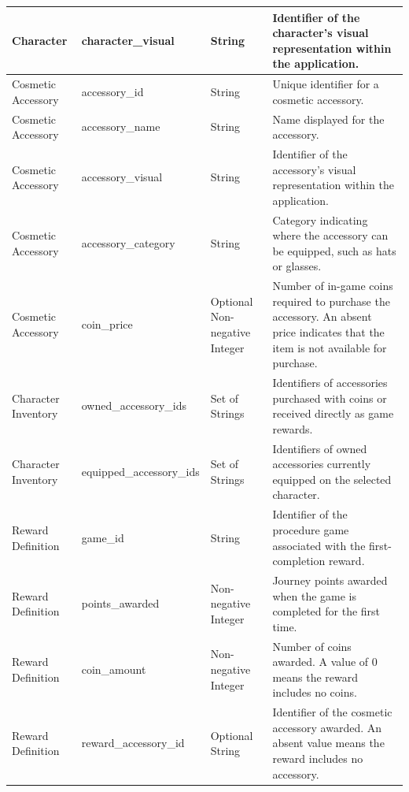 \documentclass[10pt]{article}
\begin{document}
\begin{longtable}{
    p{}
    p{}
    p{}
    p{}
}
Character &
character\_visual &
String &
Identifier of the character's visual representation
within the application. \\
\midrule

Cosmetic Accessory &
accessory\_id &
String &
Unique identifier for a cosmetic accessory. \\
\midrule

Cosmetic Accessory &
accessory\_name &
String &
Name displayed for the accessory. \\
\midrule

Cosmetic Accessory &
accessory\_visual &
String &
Identifier of the accessory's visual representation
within the application. \\
\midrule

Cosmetic Accessory &
accessory\_category &
String &
Category indicating where the accessory can
be equipped, such as hats or glasses. \\
\midrule

Cosmetic Accessory &
coin\_price &
Optional Non-negative Integer &
Number of in-game coins required to purchase
the accessory. An absent price indicates that
the item is not available for purchase. \\
\midrule

Character Inventory &
owned\_accessory\_ids &
Set of Strings &
Identifiers of accessories purchased with coins
or received directly as game rewards. \\
\midrule

Character Inventory &
equipped\_\allowbreak accessory\_ids &
Set of Strings &
Identifiers of owned accessories currently
equipped on the selected character. \\
\midrule

Reward Definition &
game\_id &
String &
Identifier of the procedure game associated
with the first-completion reward. \\
\midrule

Reward Definition &
points\_awarded &
Non-negative Integer &
Journey points awarded when the game is
completed for the first time. \\
\midrule

Reward Definition &
coin\_amount &
Non-negative Integer &
Number of coins awarded. A value of 0 means the
reward includes no coins. \\
\midrule

Reward Definition &
reward\_accessory\_id &
Optional String &
Identifier of the cosmetic accessory awarded. An
absent value means the reward includes no accessory. \\
\midrule


\end{longtable}
\end{document}
